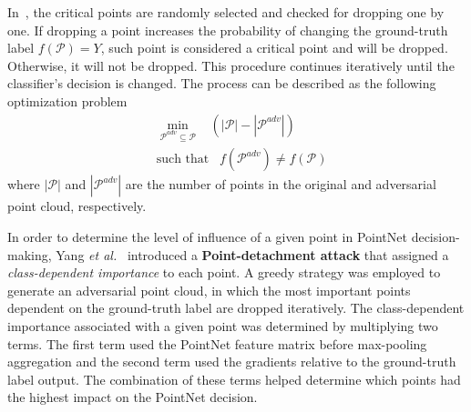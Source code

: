 \documentclass{ieeeaccess}
\def\etal{\textit{et al.}}
\begin{document}
In~\cite{wicker2019robustness}, the critical points are randomly selected and checked for dropping one by one. If dropping a point increases the probability of changing the ground-truth label  $f(\mathcal{P}) = Y$, such point is considered a critical point and will be dropped. Otherwise, it will not be dropped. This procedure continues iteratively until %
the classifier's decision is changed. The process can be described %
as the following optimization problem
\begin{equation}
\begin{split}
&\min\limits_{\mathcal{P}^{adv} \subseteq \mathcal{P}}   \;\;\;    (|\mathcal{P}| - |\mathcal{P}^{adv}|) \\
&\text{such that}  \;\;\;  f(\mathcal{P}^{adv}) \neq f(\mathcal{P})  
 \end{split}
\label{eq:60}
\end{equation}
where $|\mathcal{P}|$ and $|\mathcal{P}^{adv}|$ are the number of points in the original and adversarial point cloud, respectively. %

In order to determine the level of %
influence of a given point in PointNet decision-making, Yang \etal~\cite{yang2019adversarial} introduced a \textbf{Point-detachment attack} that assigned a \textit{class-dependent importance} to each point. A greedy strategy was employed to generate an adversarial point cloud, in which the most important points dependent on the ground-truth label are dropped iteratively. The class-dependent importance associated with a given point was determined by multiplying two terms. The first term used the PointNet feature matrix before max-pooling aggregation %
and the second term used the gradients relative to the ground-truth label output. The combination of these terms helped determine which points had the highest impact on the PointNet decision. %
\end{document}
